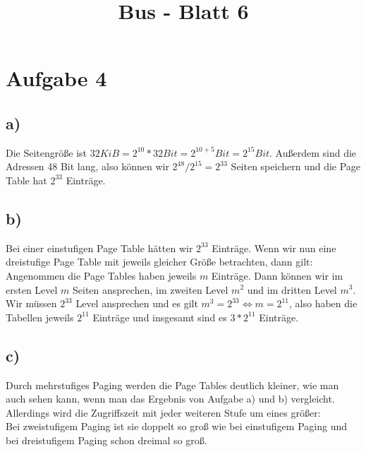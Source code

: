 \documentclass{article}
\title{Bus - Blatt 6}
\date{}
\begin{document}
\maketitle

\section*{Aufgabe 4}

\subsection*{a)}

Die Seitengröße ist $32 KiB = 2^{10}*32 Bit = 2^{10+5} Bit = 2^{15} Bit$.
Außerdem sind die Adressen 48 Bit lang, also können wir $2^{48}/2^{15} = 2^{33}$
Seiten speichern und die Page Table hat $2^{33}$ Einträge.

\subsection*{b)}

Bei einer einstufigen Page Table hätten wir $2^{33}$ Einträge. Wenn wir nun
eine dreistufige Page Table mit jeweils gleicher Größe betrachten, dann gilt:\\
Angenommen die Page Tables haben jeweils $m$ Einträge. Dann können wir
im ersten Level $m$ Seiten ansprechen, im zweiten Level $m^2$ und im dritten
Level $m^3$. Wir müssen $2^{33}$ Level ansprechen und es gilt
$m^3 = 2^33 \Leftrightarrow m = 2^{11}$, also haben die Tabellen jeweils
$ 2^{11} $ Einträge und insgesamt sind es $ 3 * 2^{11} $ Einträge.

\subsection*{c)}

Durch mehrstufiges Paging werden die Page Tables deutlich kleiner, wie man
auch sehen kann, wenn man das Ergebnis von Aufgabe a) und b) vergleicht.
Allerdings wird die Zugriffszeit mit jeder weiteren Stufe um eines größer:\\
Bei zweistufigem Paging ist sie doppelt so groß wie bei einstufigem Paging
und bei dreistufigem Paging schon dreimal so groß.
\end{document}
